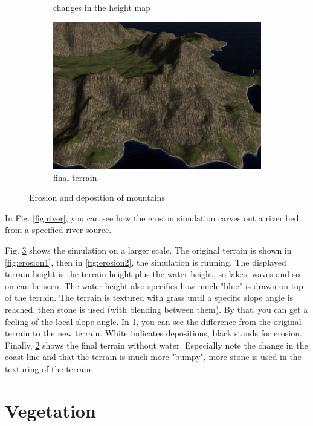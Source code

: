 \documentclass[journal, letterpaper]{IEEEtran}
\begin{document}
\begin{figure}
\begin{subfigure}[b]{0.45\textwidth}
		\caption{changes in the height map}
		\label{fig:erosion3}
	\end{subfigure}
	\begin{subfigure}[b]{0.45\textwidth}
		\includegraphics[width=\textwidth]{images/Erosion4}
		\caption{final terrain}
		\label{fig:erosion4}
	\end{subfigure}
	\caption{Erosion and deposition of mountains}\label{fig:erosion}
\end{figure}

In Fig. \ref{fig:river}, you can see how the erosion simulation carves out a river bed from a specified river source.

Fig. \ref{fig:erosion} shows the simulation on a larger scale. The original terrain is shown in \ref{fig:erosion1}, then in \ref{fig:erosion2}, the simulation is running. The displayed terrain height is the terrain height plus the water height, so lakes, waves and so on can be seen. The water height also specifies how much "blue" is drawn on top of the terrain. The terrain is textured with grass until a specific slope angle is reached, then stone is used (with blending between them). By that, you can get a feeling of the local slope angle. In \ref{fig:erosion3}, you can see the difference from the original terrain to the new terrain. White indicates depositions, black stands for erosion. Finally, \ref{fig:erosion4} shows the final terrain without water. Especially note the change in the coast line and that the terrain is much more "bumpy", more stone is used in the texturing of the terrain.

\section{Vegetation}\label{Vegetation}
\end{document}
